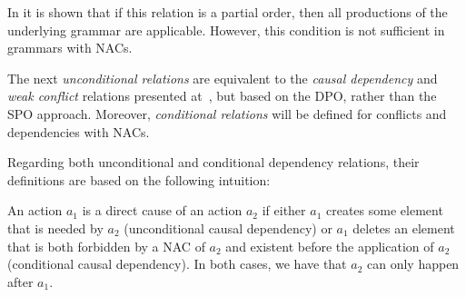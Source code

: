 \begin{example}
\end{example}

In \cite{Corradini1996} it is shown that if this relation is a partial order, then all productions of the underlying grammar are applicable. However, this condition is not sufficient in grammars with NACs.

\begin{example}
\end{example}

The next \emph{unconditional relations} are equivalent to the \emph{causal dependency} and \emph{weak conflict} relations presented at~\cite{Ribeiro1996}, but based on the DPO, rather than the SPO approach. Moreover, \emph{conditional relations} will be defined for conflicts and dependencies with NACs.

Regarding both unconditional and conditional dependency relations, their definitions are based on the following intuition:

\begin{intuition} An action $a_1$ is a direct cause of an action $a_2$ if either $a_1$ creates some element that is needed by $a_2$ (unconditional causal dependency) or $a_1$ deletes an element that is both forbidden by a NAC of $a_2$ and existent before the application of $a_2$ (conditional causal dependency). In both cases, we have that $a_2$ can only happen after $a_1$. 
\end{intuition}

